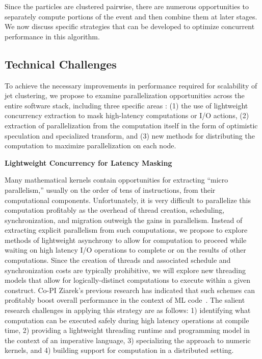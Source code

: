 \documentclass[times,11pt]{article}
\begin{document}
Since the particles are clustered pairwise, there are numerous
opportunities to separately compute portions of the event and then
combine them at later stages. 
We now
discuss specific strategies that can be developed 
to optimize concurrent performance in this algorithm. 


\iffalse
There is existing work and literature on the topic of the
parallelization of similar kNN algorithms, for instance, in
Refs.~\cite{knn_gpu_1, knn_gpu_2, knn_gpu_3}, where improvements
$O(100)$ in CPU performance are observed over standard
algorithms. Since the proposed use case is
very similar to the kNN algorithm, similar improvements to the
processing time by parallelization strategies are expected. 
\fi



\subsection{Technical Challenges}

To achieve the necessary improvements in performance required for scalability
of jet clustering, we propose to examine parallelization opportunities across
the entire software stack, including three specific areas : 
(1) the use of lightweight concurrency
extraction to mask high-latency computations or I/O actions, 
(2) extraction of
parallelization from the computation itself in the form of optimistic speculation
and specialized transform, and
(3) new methods for distributing the computation to
maximize parallelization on each node. 


\bigskip
\noindent
{\bf  Lightweight Concurrency for Latency Masking}
\bigskip

Many mathematical kernels contain opportunities for extracting ``micro parallelism,''
usually on the order of tens of instructions, from their computational components. 
Unfortunately, it is very difficult to parallelize this computation profitably as
the overhead of thread creation, scheduling, synchronization, and migration outweigh
the gains in parallelism. Instead of extracting explicit parallelism from such
computations, we propose to explore methods of lightweight asynchrony to allow for
computation to proceed while waiting on high latency I/O operations to complete or on
the results of other computations. Since the creation of threads and associated
schedule and synchronization costs are typically prohibitive, we will explore new
threading models that allow for logically-distinct computations to execute within
a given construct. Co-PI Ziarek's previous research has indicated that such schemes can profitably
boost overall performance in the context of ML code~\cite{acml, parasites}. 
The salient research
challenges in applying this strategy are as follows:  1) identifying what computation can be executed
safely during high latency operations at compile time, 2) providing a lightweight threading runtime
and programming model in the context of an imperative language, 
3) specializing the approach to numeric kernels,
and 4) building support for computation in a distributed setting.
\end{document}
